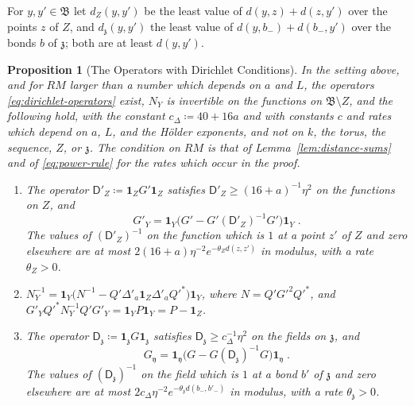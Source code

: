 \documentclass[11pt]{preprint}
\numberwithin{equation}{section}
\newtheorem{proposition}[theorem]{Proposition}
\theoremstyle{definition}
\theoremstyle{remark}
\theoremstyle{plain}
\begin{document}
For $y, y' \in \mathfrak B$ let $d_Z(y, y')$ be the least value of $d(y, z) + d(z, y')$ over the points $z$ of $Z$, and $d_{\mathfrak z}(y, y')$ the least value of $d(y, b_-) + d(b_-, y')$ over the bonds $b$ of $\mathfrak z$; both are at least $d(y, y')$.

\begin{proposition}[The Operators with Dirichlet Conditions]\label{prop:dirichlet}
In the setting above, and for $RM$ larger than a number which depends on $a$ and $L$, the operators \eqref{eq:dirichlet-operators} exist, $N_Y$ is invertible on the functions on $\mathfrak B \setminus Z$, and the following hold, with the constant $c_\Delta \coloneqq 40 + 16a$ and with constants $c$ and rates which depend on $a$, $L$, and the H\"older exponents, and not on $k$, the torus, the sequence, $Z$, or $\mathfrak z$. The condition on $RM$ is that of Lemma~\ref{lem:distance-sums} and of \eqref{eq:power-rule} for the rates which occur in the proof.
\begin{enumerate}[label=(\roman*)]
\item The operator $\mathsf D'_Z \coloneqq \mathbf 1_ZG'\mathbf 1_Z$ satisfies $\mathsf D'_Z \geq (16 + a)^{-1}\eta^2$ on the functions on $Z$, and
\begin{equation}\label{eq:dirichlet-scalar}
    G'_Y = \mathbf 1_Y\bigl(G' - G'(\mathsf D'_Z)^{-1}G'\bigr)\mathbf 1_Y\;.
\end{equation}
The values of $(\mathsf D'_Z)^{-1}$ on the function which is $1$ at a point $z'$ of $Z$ and zero elsewhere are at most $2(16 + a)\eta^{-2}e^{-\theta_Zd(z, z')}$ in modulus, with a rate $\theta_Z > 0$.
\item $N_Y^{-1} = \mathbf 1_Y\bigl(N^{-1} - Q'\Delta'_a\mathbf 1_Z\Delta'_aQ'^*\bigr)\mathbf 1_Y$, where $N = Q'G'^2Q'^*$, and $G'_YQ'^*N_Y^{-1}Q'G'_Y = \mathbf 1_YP\mathbf 1_Y = P - \mathbf 1_Z$.
\item The operator $\mathsf D_{\mathfrak z} \coloneqq \mathbf 1_{\mathfrak z}G\mathbf 1_{\mathfrak z}$ satisfies $\mathsf D_{\mathfrak z} \geq c_\Delta^{-1}\eta^2$ on the fields on $\mathfrak z$, and
\begin{equation}\label{eq:dirichlet-propagator}
    G_{\mathfrak y} = \mathbf 1_{\mathfrak y}\bigl(G - G(\mathsf D_{\mathfrak z})^{-1}G\bigr)\mathbf 1_{\mathfrak y}\;.
\end{equation}
The values of $(\mathsf D_{\mathfrak z})^{-1}$ on the field which is $1$ at a bond $b'$ of $\mathfrak z$ and zero elsewhere are at most $2c_\Delta\eta^{-2}e^{-\theta_{\mathfrak z}d(b_-, b'_-)}$ in modulus, with a rate $\theta_{\mathfrak z} > 0$.

\end{enumerate}
\end{proposition}
\end{document}
